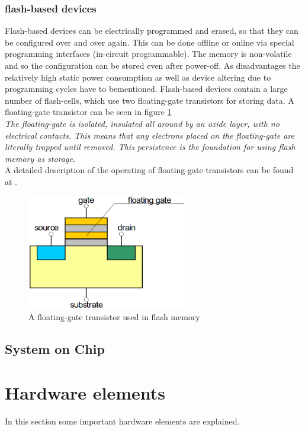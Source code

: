 \subsubsection{flash-based devices}
Flash-based devices can be electrically programmed and erased, so that they can be configured over and over again. This can be done offline or online via special programming interfaces (in-circuit programmable). The memory is non-volatile and so the configuration can be stored even after power-off. As disadvantages the relatively high static power consumption\cite{Qui16} as well as device altering due to programming cycles have to bementioned. Flash-based devices contain a large number of flash-cells, which use two floating-gate transistors for storing data. A floating-gate transistor can be seen in figure \ref{fig:FlashTransistor}\\
\textit{The floating-gate is isolated, insulated all around by an oxide layer, with no electrical contacts. This means that any electrons placed on the floating-gate are literally trapped until removed. This persistence is the foundation for using flash memory as storage.}\cite{Flash16}\\
A detailed description of the operating of floating-gate transistors can be found at \cite{Cse16}.\\

\begin{figure}[htbp]
\begin{center}
\includegraphics[width=7cm,keepaspectratio=true]{bilder/png/FlashTransistor}
\caption{A floating-gate transistor used in flash memory\cite{Core16}}
\label{fig:FlashTransistor}
\end{center}
\end{figure}
\subsection{System on Chip}

\section{Hardware elements}
In this section some important hardware elements are explained.
